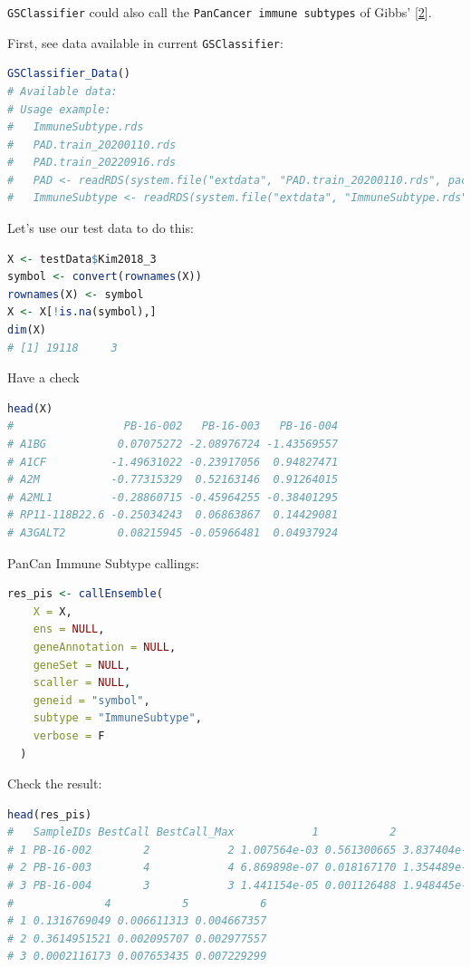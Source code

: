 \documentclass[
  12pt,
]{book}
\newcommand{\passthrough}[1]{#1}
\begin{document}
\passthrough{\lstinline!GSClassifier!} could also call the \passthrough{\lstinline!PanCancer immune subtypes!} of Gibbs' {[}\protect\hyperlink{ref-RN315}{2}{]}.

First, see data available in current \passthrough{\lstinline!GSClassifier!}:

\begin{lstlisting}[language=R]
GSClassifier_Data()
# Available data:
# Usage example:
#   ImmuneSubtype.rds 
#   PAD.train_20200110.rds 
#   PAD.train_20220916.rds 
#   PAD <- readRDS(system.file("extdata", "PAD.train_20200110.rds", package = "GSClassifier")) 
#   ImmuneSubtype <- readRDS(system.file("extdata", "ImmuneSubtype.rds", package = "GSClassifier"))
\end{lstlisting}

Let's use our test data to do this:

\begin{lstlisting}[language=R]
X <- testData$Kim2018_3
symbol <- convert(rownames(X))
rownames(X) <- symbol
X <- X[!is.na(symbol),]
dim(X)
# [1] 19118     3
\end{lstlisting}

Have a check

\begin{lstlisting}[language=R]
head(X)
#                 PB-16-002   PB-16-003   PB-16-004
# A1BG           0.07075272 -2.08976724 -1.43569557
# A1CF          -1.49631022 -0.23917056  0.94827471
# A2M           -0.77315329  0.52163146  0.91264015
# A2ML1         -0.28860715 -0.45964255 -0.38401295
# RP11-118B22.6 -0.25034243  0.06863867  0.14429081
# A3GALT2        0.08215945 -0.05966481  0.04937924
\end{lstlisting}

PanCan Immune Subtype callings:

\begin{lstlisting}[language=R]
res_pis <- callEnsemble(
    X = X,
    ens = NULL,
    geneAnnotation = NULL,
    geneSet = NULL,
    scaller = NULL,
    geneid = "symbol",
    subtype = "ImmuneSubtype",
    verbose = F
  )
\end{lstlisting}

Check the result:

\begin{lstlisting}[language=R]
head(res_pis)
#   SampleIDs BestCall BestCall_Max            1           2            3
# 1 PB-16-002        2            2 1.007564e-03 0.561300665 3.837404e-06
# 2 PB-16-003        4            4 6.869898e-07 0.018167170 1.354489e-04
# 3 PB-16-004        3            3 1.441154e-05 0.001126488 1.948445e-01
#              4           5           6
# 1 0.1316769049 0.006611313 0.004667357
# 2 0.3614951521 0.002095707 0.002977557
# 3 0.0002116173 0.007653435 0.007229299
\end{lstlisting}
\end{document}
